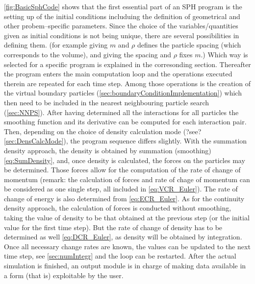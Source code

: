 \documentclass{report}
\begin{document}
\ref{fig:BasicSphCode} shows that the first essential part of an SPH program is the setting up of the initial conditions includuing the definition of geometrical and other
probem--specific parameters. Since the choice of the variables/quantities given as 
initial conditions is not being unique, there are several possibilities in defining 
them. (for example giving $m$ and $\rho$ defines the particle spacing (which corresponds
to the volume), and giving the spacing and $\rho$ fixes $m$.) Which way is selected for 
a specific program is explained in the corresonding section. 
Thereafter the program enters the main computation loop and the operations executed 
therein are repeated for each time step. Among those operations is the creation of the 
virtual boundary particles (\ref{sec:boundaryConditionImplementation}) which then 
need to be included in the nearest neighbouring particle search (\ref{sec:NNPS}). 
After having determined all the interactions for all particles the smoothing function 
and its derivative can be computed for each interaction pair. Then, depending on the 
choice of density calculation mode (?see? \ref{sec:DensCalcMode}), the program sequence differs slightly. 
With the summation density approach, the density is obtained by summation 
(smoothing)\ref{eq:SumDensity}, and, once density is calculated, the forces on the 
particles may be determined. Those forces allow for the computation of the rate
of change of momentum (remark: the calculation of forces and rate of chage of  momentum 
can be considered as one single step, all included in \ref{eq:VCR_Euler}). The 
rate of change of energy is also determined from \ref{eq:ECR_Euler}.
As for the continuity density approach, the calculation of forces is conducted without 
smoothing, taking the value of density to be that obtained at the previous step 
(or the initial value for the first time step). But the rate of change of density 
has to be determined as well \ref{eq:DCR_Euler}, as density will be obtained by integration. 
Once all necessary change rates are known, the values can be updated to the next time step, see \ref{sec:numIntegr} and the loop can be restarted. After the actual simulation is finished, an output module is in charge of making data available in a form (that is) exploitable by the user.
\end{document}
